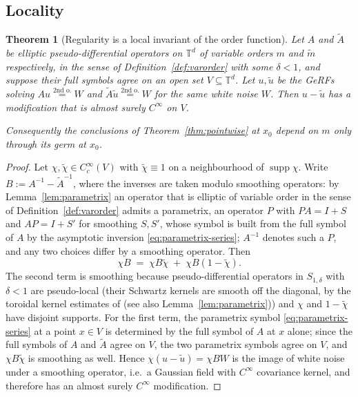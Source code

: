 \documentclass[pdflatex,sn-mathphys,Numbered]{sn-jnl}
\theoremstyle{thmstyleone}%
\newtheorem{theorem}{Theorem}[section]%
\theoremstyle{thmstyletwo}%
\theoremstyle{thmstylethree}%
\newcommand{\TT}{\mathbb{T}}
\newcommand{\eqso}{\stackrel{\text{2nd o.}}{=}}
\DeclareMathOperator{\supp}{supp}
\begin{document}
\subsection{Locality}

\begin{theorem}[Regularity is a local invariant of the order function]
\label{thm:locality}
Let $A$ and $\tilde A$ be elliptic pseudo-differential operators on $\TT^d$ of
variable orders $m$ and $\tilde m$ respectively, in the sense of
Definition~\ref{def:varorder} with some $\delta<1$, and suppose their full
symbols agree on an open set $V\subseteq\TT^d$. Let $u,\tilde u$ be the GeRFs
solving $Au \eqso W$ and $\tilde A\tilde u \eqso W$
for the same white noise $W$. Then $u - \tilde u$ has a modification that is
almost surely $C^\infty$ on $V$.

Consequently the conclusions of Theorem~\ref{thm:pointwise} at $x_0$ depend on
$m$ only through its germ at $x_0$.
\end{theorem}

\begin{proof}
Let $\chi,\tilde\chi\in C_c^\infty(V)$ with $\tilde\chi\equiv1$ on a
neighbourhood of $\supp\chi$. Write $B := A^{-1}-\tilde A^{-1}$, where the
inverses are taken modulo smoothing operators: by
Lemma~\ref{lem:parametrix} an operator that is elliptic of variable order in the
sense of Definition~\ref{def:varorder} admits a parametrix, an operator $P$ with
$PA = I + S$ and $AP = I + S'$ for smoothing $S,S'$, whose symbol is built from
the full symbol of $A$ by the asymptotic inversion \eqref{eq:parametrix-series};
$A^{-1}$ denotes such a $P$, and any two choices differ by a smoothing operator.
Then
\[
    \chi B \;=\; \chi B \tilde\chi \;+\; \chi B(1-\tilde\chi).
\]
The second term is smoothing because pseudo-differential operators in
$S_{1,\delta}$ with $\delta<1$ are pseudo-local (their Schwartz kernels are
smooth off the diagonal, by the toroidal kernel estimates of \cite{duvan1}
(see also Lemma~\ref{lem:parametrix})) and $\chi$ and $1-\tilde\chi$ have
disjoint supports. For the first term, the parametrix symbol
\eqref{eq:parametrix-series} at a point $x \in V$ is determined by the full
symbol of $A$ at $x$ alone; since the full symbols of $A$ and $\tilde A$ agree
on $V$, the two parametrix symbols agree on $V$, and $\chi B\tilde\chi$ is
smoothing as well. Hence $\chi(u-\tilde u) = \chi B W$ is the image of white
noise under a smoothing operator, i.e.\ a Gaussian field with $C^\infty$
covariance kernel, and therefore has an almost surely $C^\infty$ modification.
\end{proof}
\end{document}
